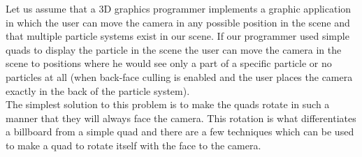 Let us assume that a 3D graphics programmer implements a graphic application in which the user can move the camera in any possible position in the scene and that multiple particle systems exist in our scene. If our programmer used simple quads to display the particle in the scene the user can move the camera in the scene to positions where he would see only a part of a specific particle or no particles at all (when back-face culling is enabled and the user places the camera exactly in the back of the particle system).\\

The simplest solution to this problem is to make the quads rotate in such a manner that they will always face the camera. This rotation is what differentiates a billboard from a simple quad and there are a few techniques which can be used to make a quad to rotate itself with the face to the camera.\\